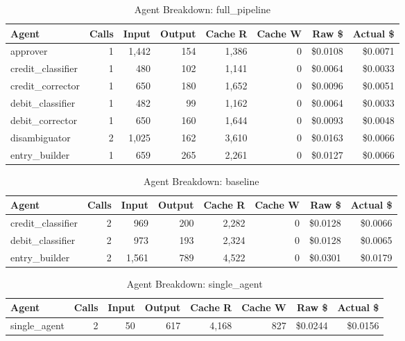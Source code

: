 \begin{table}[htbp]
\centering
\caption{Agent Breakdown: full\_pipeline}
\label{tab:agent-full-pipeline}
\begin{tabular}{l r rr rr rr}
\toprule
Agent & Calls & Input & Output & Cache R & Cache W & Raw \$ & Actual \$ \\
\midrule
  approver & 1 & 1,442 & 154 & 1,386 & 0 & \$0.0108 & \$0.0071 \\
  credit\_classifier & 1 & 480 & 102 & 1,141 & 0 & \$0.0064 & \$0.0033 \\
  credit\_corrector & 1 & 650 & 180 & 1,652 & 0 & \$0.0096 & \$0.0051 \\
  debit\_classifier & 1 & 482 & 99 & 1,162 & 0 & \$0.0064 & \$0.0033 \\
  debit\_corrector & 1 & 650 & 160 & 1,644 & 0 & \$0.0093 & \$0.0048 \\
  disambiguator & 2 & 1,025 & 162 & 3,610 & 0 & \$0.0163 & \$0.0066 \\
  entry\_builder & 1 & 659 & 265 & 2,261 & 0 & \$0.0127 & \$0.0066 \\
\bottomrule
\end{tabular}
\end{table}

\begin{table}[htbp]
\centering
\caption{Agent Breakdown: baseline}
\label{tab:agent-baseline}
\begin{tabular}{l r rr rr rr}
\toprule
Agent & Calls & Input & Output & Cache R & Cache W & Raw \$ & Actual \$ \\
\midrule
  credit\_classifier & 2 & 969 & 200 & 2,282 & 0 & \$0.0128 & \$0.0066 \\
  debit\_classifier & 2 & 973 & 193 & 2,324 & 0 & \$0.0128 & \$0.0065 \\
  entry\_builder & 2 & 1,561 & 789 & 4,522 & 0 & \$0.0301 & \$0.0179 \\
\bottomrule
\end{tabular}
\end{table}

\begin{table}[htbp]
\centering
\caption{Agent Breakdown: single\_agent}
\label{tab:agent-single-agent}
\begin{tabular}{l r rr rr rr}
\toprule
Agent & Calls & Input & Output & Cache R & Cache W & Raw \$ & Actual \$ \\
\midrule
  single\_agent & 2 & 50 & 617 & 4,168 & 827 & \$0.0244 & \$0.0156 \\
\bottomrule
\end{tabular}
\end{table}
